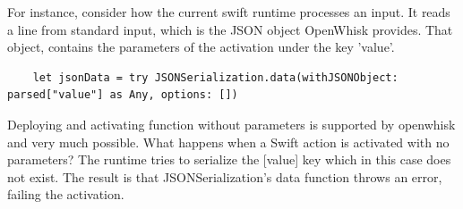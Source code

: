 For instance, consider how the current swift runtime processes an input. It reads a line from standard input, which is the JSON object OpenWhisk provides. That object, contains the parameters of the activation under the key 'value'. 
\begin{verbatim}
	let jsonData = try JSONSerialization.data(withJSONObject: parsed["value"] as Any, options: [])
\end{verbatim}

Deploying and activating function without parameters is supported by openwhisk and very much possible. What happens when a Swift action is activated with no parameters? The runtime tries to serialize the [value] key which in this case does not exist. The result is that JSONSerialization's data function throws an error, failing the activation. 


